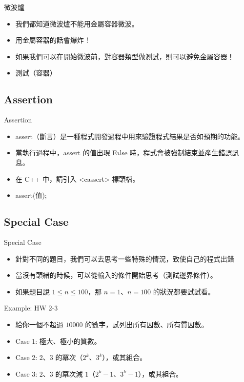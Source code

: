 \documentclass[t]{beamer}
\begin{document}
\begin{frame}{微波爐}
  \begin{itemize}
    \item 我們都知道微波爐不能用金屬容器微波。
    \item 用金屬容器的話會爆炸！
    \item 如果我們可以在開始微波前，對容器類型做測試，則可以避免金屬容器！
    \item 測試（容器）
  \end{itemize}
\end{frame}

\subsection{Assertion}
\begin{frame}{Assertion}
  \begin{itemize}
    \item assert（斷言）是一種程式開發過程中用來驗證程式結果是否如預期的功能。
    \item 當執行過程中，assert 的值出現 False 時，程式會被強制結束並產生錯誤訊息。
    \item 在 C++ 中，請引入 <cassert> 標頭檔。
    \item assert(值);
  \end{itemize}
\end{frame}

\subsection{Special Case}
\begin{frame}{Special Case}
  \begin{itemize}
    \item 針對不同的題目，我們可以去思考一些特殊的情況，致使自己的程式出錯
    \item 當沒有頭緒的時候，可以從輸入的條件開始思考（測試邊界條件）。
    \item 如果題目說 $1\le n\le 100$，那 $n=1$、$n=100$ 的狀況都要試試看。
  \end{itemize}
\end{frame}

\begin{frame}{Example: HW 2-3}
  \begin{itemize}
    \item 給你一個不超過 $10000$ 的數字，試列出所有因數、所有質因數。
    \item Case 1: 極大、極小的質數。
    \item Case 2: $2$、$3$ 的冪次（$2^k$、$3^k$），或其組合。
    \item Case 3: $2$、$3$ 的冪次減 $1$（$2^k-1$、$3^k-1$），或其組合。
  \end{itemize}
\end{frame}
\end{document}
